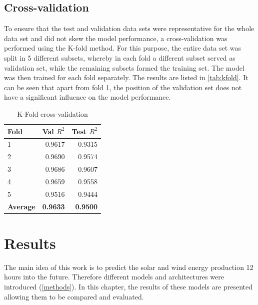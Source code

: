 \documentclass[11pt,table]{article}
\begin{document}
\subsection{Cross-validation}
To ensure that the test and validation data sets were representative for the whole data set and did not skew the model performance, a cross-validation was performed using the K-fold method. For this purpose, the entire data set was split in 5 different subsets, whereby in each fold a different subset served as validation set, while the remaining subsets formed the training set. The model was then trained for each fold separately. The results are listed in \autoref{tab:kfold}. It can be seen that apart from fold 1, the position of the validation set does not have a significant influence on the model performance.

\begin{table}[ht]
\centering
\caption{K-Fold cross-validation}
\begin{tabular}{lrr}
\toprule
\textbf{Fold} & \textbf{Val} \boldmath$R^2$ & \textbf{Test} \boldmath$R^2$ \\ \midrule
1 & 0.9617 & 0.9315  \\
2 & 0.9690 & 0.9574  \\
3 & 0.9686 & 0.9607  \\
4 & 0.9659 & 0.9558  \\
5 & 0.9516 & 0.9444  \\ \midrule
\textbf{Average} & \textbf{0.9633} & \textbf{0.9500} \\ \bottomrule
\end{tabular}
\label{tab:kfold}
\end{table}

\section{Results}
The main idea of this work is to predict the solar and wind energy production 12 hours into the future. Therefore different models and architectures were introduced (\autoref{methods}). In this chapter, the results of these models are presented allowing them to be compared and evaluated. 

\end{document}
